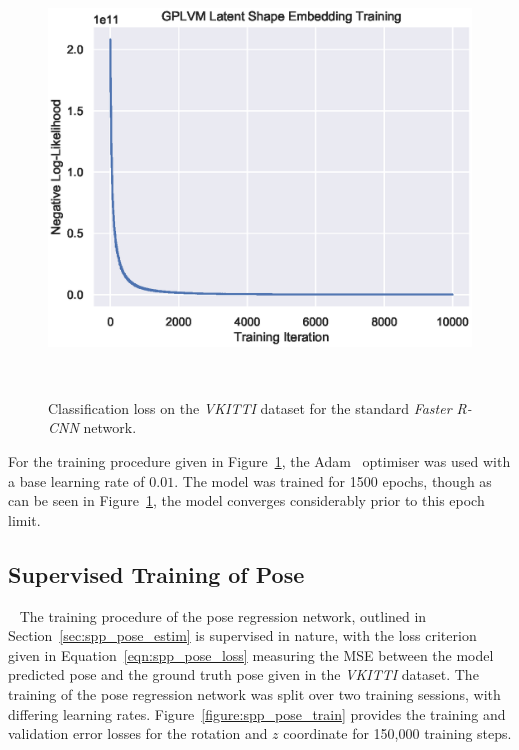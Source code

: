 \begin{figure}[!htbp]
  \centering
  \includegraphics[width=.8\linewidth]{figures/spp/quant/gp_train.eps}
  \caption[VKITTI Classification Training]{Classification loss on the \textit{VKITTI} 
  dataset for the standard \textit{Faster R-CNN} network.}
~\label{figure:spp_gplvm_train}
\end{figure}

For the training procedure given in Figure~\ref{figure:spp_gplvm_train}, the Adam~\cite{Kingma2014} 
optimiser was used with a base learning rate of \( 0.01 \). The model was trained for 1500 epochs, 
though as can be seen in Figure~\ref{figure:spp_gplvm_train}, the model converges considerably 
prior to this epoch limit.

\subsection{Supervised Training of Pose}
~\label{sec:spp_quantitative_pose_train}
The training procedure of the pose regression network, outlined in Section~\ref{sec:spp_pose_estim} is supervised 
in nature, with the loss criterion given in Equation~\ref{eqn:spp_pose_loss} measuring the MSE between the model predicted 
pose and the ground truth pose given in the \textit{VKITTI} dataset. The training of the pose regression network was split 
over two training sessions, with differing learning rates. Figure~\ref{figure:spp_pose_train} provides the training and validation 
error losses for the rotation and \( z \) coordinate for 150,000 training steps.

